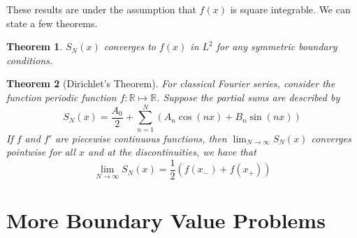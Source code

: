 \documentclass{article}
\newcommand{\R}{\mathbb{R}}
\newtheorem{theorem}{Theorem}[section]
\theoremstyle{definition}
\begin{document}
These results are under the assumption that $f(x)$ is square integrable. We can state a few theorems.
\begin{theorem}
    $S_N(x)$ converges to $f(x)$ in $L^2$ for any symmetric boundary conditions.
\end{theorem}
\begin{theorem}[Dirichlet's Theorem]
    For classical Fourier series, consider the function periodic function $f:\R \mapsto \R$. Suppose the partial sums are described by 
    \begin{equation*}
        S_N(x) = \frac{A_0}{2} + \sum^N_{n=1}(A_n\cos(nx)+B_n\sin (nx))
    \end{equation*}
    If $f$ and $f'$ are piecewise continuous functions, then $\displaystyle{\lim_{N\to \infty}S_N(x)}$ converges pointwise for all $x$ and at the discontinuities, we have that 
    \begin{equation*}
        \lim_{N\to\infty}S_N(x)=\frac{1}{2}(f(x_-)+f(x_+))
    \end{equation*}
\end{theorem}
\section{More Boundary Value Problems}
\end{document}
